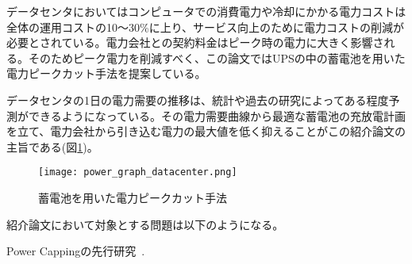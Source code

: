 データセンタにおいてはコンピュータでの消費電力や冷却にかかる電力コストは全体の運用コストの10〜30\%に上り、サービス向上のために電力コストの削減が必要とされている。電力会社との契約料金はピーク時の電力に大きく影響される。そのためピーク電力を削減すべく、この論文ではUPSの中の蓄電池を用いた電力ピークカット手法を提案している。

データセンタの1日の電力需要の推移は、統計や過去の研究によってある程度予測ができるようになっている。その電力需要曲線から最適な蓄電池の充放電計画を立て、電力会社から引き込む電力の最大値を低く抑えることがこの紹介論文の主旨である(図\ref{fig:power_graph_datacenter})。
\begin{figure}[t]
 \begin{center}
  \texttt{[image: power\_graph\_datacenter.png]}
 \end{center}
 \caption{蓄電池を用いた電力ピークカット手法}
 \label{fig:power_graph_datacenter}
\end{figure}

紹介論文において対象とする問題は以下のようになる。





Power Cappingの先行研究~\cite{Fan:2007:PPW:1273440.1250665}.
